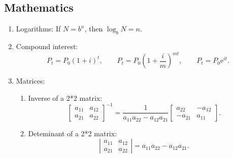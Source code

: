 \subsection{Mathematics}

\begin{enumerate}
	\item Logarithms: If $N=b^{n}$, then $\log _{b}N=n.$
	
	\item Compound interest:%
	\begin{equation*}
	P_{t}=P_{0}\left( 1+i\right) ^{t},\qquad P_{t}=P_{0}\left( 1+\frac{i}{m}%
	\right) ^{mt},\qquad P_{t}=P_{0}\mathrm{e}^{it}.
	\end{equation*}
	
	\item Matrices:
	
	\begin{enumerate}
		\item Inverse of a 2*2 matrix:
		\begin{equation*}
		\left[
		\begin{array}{cc}
		a_{11} & a_{12} \\
		a_{21} & a_{22}%
		\end{array}%
		\right] ^{-1}=\frac{1}{a_{11}a_{22}-a_{12}a_{21}}\left[
		\begin{array}{cc}
		a_{22} & -a_{12} \\
		-a_{21} & a_{11}%
		\end{array}%
		\right] .
		\end{equation*}
		
		\item Deteminant of a 2*2 matrix:
		\begin{equation*}
		\left\vert
		\begin{array}{cc}
		a_{11} & a_{12} \\
		a_{21} & a_{22}%
		\end{array}%
		\right\vert =a_{11}a_{22}-a_{12}a_{21}.
		\end{equation*}
		

\end{enumerate}
\end{enumerate}
